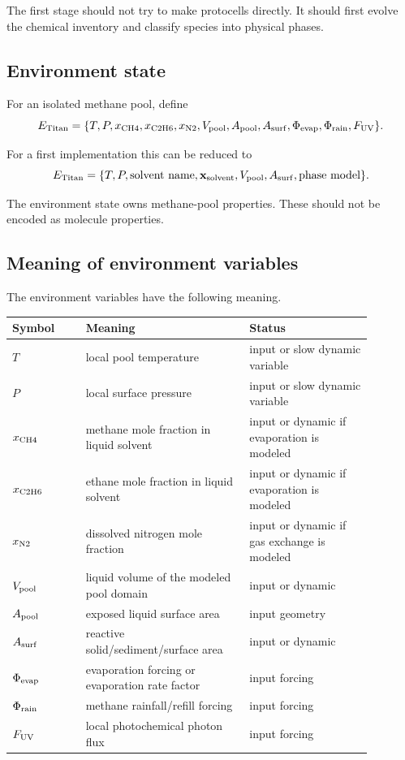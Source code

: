 \documentclass[11pt]{article}
\begin{document}
The first stage should not try to make protocells directly. It should first evolve the chemical inventory and classify species into physical phases.

\subsection{Environment state}

For an isolated methane pool, define
\begin{equation}
E_{\rm Titan}
=
\{T, P, x_{\rm CH4}, x_{\rm C2H6}, x_{\rm N2}, V_{\rm pool}, A_{\rm pool}, A_{\rm surf},
\Phi_{\rm evap}, \Phi_{\rm rain}, F_{\rm UV}\}.
\end{equation}

For a first implementation this can be reduced to
\begin{equation}
E_{\rm Titan}
=
\{T, P, \text{solvent name}, \mathbf{x}_{\rm solvent}, V_{\rm pool}, A_{\rm surf}, \text{phase model}\}.
\end{equation}

The environment state owns methane-pool properties. These should not be encoded as molecule properties.

\subsection{Meaning of environment variables}

The environment variables have the following meaning.
\begin{center}
\begin{tabular}{p{0.18\linewidth}p{0.40\linewidth}p{0.30\linewidth}}
\toprule
Symbol & Meaning & Status \\
\midrule
$T$ & local pool temperature & input or slow dynamic variable \\
$P$ & local surface pressure & input or slow dynamic variable \\
$x_{\rm CH4}$ & methane mole fraction in liquid solvent & input or dynamic if evaporation is modeled \\
$x_{\rm C2H6}$ & ethane mole fraction in liquid solvent & input or dynamic if evaporation is modeled \\
$x_{\rm N2}$ & dissolved nitrogen mole fraction & input or dynamic if gas exchange is modeled \\
$V_{\rm pool}$ & liquid volume of the modeled pool domain & input or dynamic \\
$A_{\rm pool}$ & exposed liquid surface area & input geometry \\
$A_{\rm surf}$ & reactive solid/sediment/surface area & input or dynamic \\
$\Phi_{\rm evap}$ & evaporation forcing or evaporation rate factor & input forcing \\
$\Phi_{\rm rain}$ & methane rainfall/refill forcing & input forcing \\
$F_{\rm UV}$ & local photochemical photon flux & input forcing \\
\bottomrule
\end{tabular}
\end{center}
\end{document}

